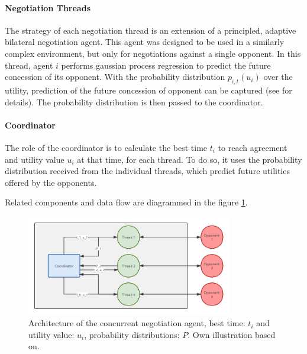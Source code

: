 \paragraph{Negotiation Threads} The strategy of each negotiation thread is an extension of a principled, adaptive bilateral negotiation agent. This agent was designed to be used in a similarly complex environment, but only for negotiations against a single opponent. In this thread, agent $i$ performs gaussian process regression to predict the future concession of its opponent. With the probability distribution $p_{i, t}(u_i)$ over the utility, prediction of the future concession of opponent can be captured (see \parencite{Williams2011} for details). The probability distribution is then passed to the coordinator.

\paragraph{Coordinator} The role of the coordinator is to calculate the best time $t_i$ to reach agreement and utility value $u_i$ at that time, for each thread. To do so, it uses the probability distribution received from the individual threads, which predict future utilities offered by the opponents.  

Related components and data flow are diagrammed in the figure \ref{fig:heuristic-concurrent-negotiation}.
\begin{figure}[htbp]
\centering
\includegraphics[width=0.8\textwidth]{./images/heuristic_concurrent_negotiation.png}
\caption{Architecture of the concurrent negotiation agent, best time: $t_i$ and utility value: $u_i$, probability distributions: $P$. Own illustration based on\parencite{Williams12Concurrent}.}
\label{fig:heuristic-concurrent-negotiation}
\end{figure}

